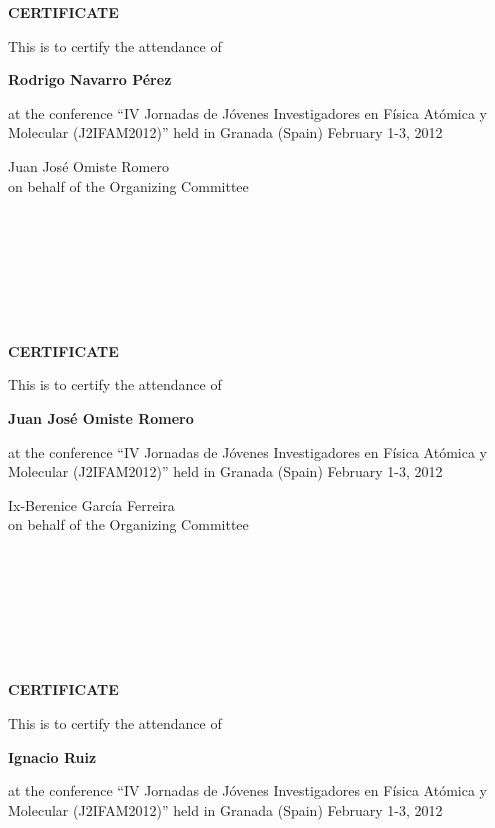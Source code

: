 \documentclass [13pt,a4paper] {letter}
\begin{document}
\pagestyle{empty}
\begin{center}
{\bf {\Huge CERTIFICATE}}

\vspace {1.5cm}
This is to certify the attendance of
\vspace {1cm}

{\bf \Large  Rodrigo    Navarro Pérez }
\vspace {1cm}

at the conference { \textquotedblleft IV Jornadas de Jóvenes Investigadores en Física Atómica y Molecular (J2IFAM2012)\textquotedblright} 
held in Granada (Spain) February 1-3, 2012
\end{center}
\vspace {4cm}
\begin{raggedleft}
Juan José Omiste Romero\\
on behalf of the Organizing Committee
\newpage
\end{raggedleft}
\begin{verbatim}







\end{verbatim}
\pagestyle{empty}
\begin{center}
{\bf {\Huge CERTIFICATE}}

\vspace {1.5cm}
This is to certify the attendance of
\vspace {1cm}

{\bf \Large  Juan   José  Omiste Romero }
\vspace {1cm}

at the conference { \textquotedblleft IV Jornadas de Jóvenes Investigadores en Física Atómica y Molecular (J2IFAM2012)\textquotedblright} 
held in Granada (Spain) February 1-3, 2012
\end{center}
\vspace {4cm}
\begin{raggedleft}
Ix-Berenice García Ferreira\\
on behalf of the Organizing Committee
\newpage
\end{raggedleft}
\begin{verbatim}







\end{verbatim}
\pagestyle{empty}
\begin{center}
{\bf {\Huge CERTIFICATE}}

\vspace {1.5cm}
This is to certify the attendance of
\vspace {1cm}

{\bf \Large  Ignacio    Ruiz }
\vspace {1cm}

at the conference { \textquotedblleft IV Jornadas de Jóvenes Investigadores en Física Atómica y Molecular (J2IFAM2012)\textquotedblright} 
held in Granada (Spain) February 1-3, 2012
\end{center}
\end{document}
